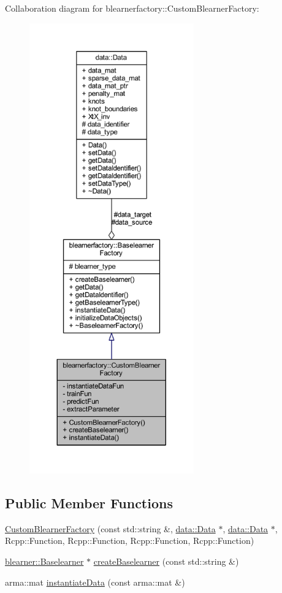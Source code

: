Collaboration diagram for blearnerfactory\+:\+:Custom\+Blearner\+Factory\+:\nopagebreak
\begin{figure}[H]
\begin{center}
\leavevmode
\includegraphics[height=550pt]{classblearnerfactory_1_1_custom_blearner_factory__coll__graph}
\end{center}
\end{figure}
\subsection*{Public Member Functions}
\begin{DoxyCompactItemize}
\item 
\hyperlink{classblearnerfactory_1_1_custom_blearner_factory_a1a006cb772dc79cbcbcab810f5431b2c}{Custom\+Blearner\+Factory} (const std\+::string \&, \hyperlink{classdata_1_1_data}{data\+::\+Data} $\ast$, \hyperlink{classdata_1_1_data}{data\+::\+Data} $\ast$, Rcpp\+::\+Function, Rcpp\+::\+Function, Rcpp\+::\+Function, Rcpp\+::\+Function)
\item 
\hyperlink{classblearner_1_1_baselearner}{blearner\+::\+Baselearner} $\ast$ \hyperlink{classblearnerfactory_1_1_custom_blearner_factory_aad915d1ac58a323d1584d27f8cdace56}{create\+Baselearner} (const std\+::string \&)
\item 
arma\+::mat \hyperlink{classblearnerfactory_1_1_custom_blearner_factory_aac818f8969820d37ec1a391abbb996da}{instantiate\+Data} (const arma\+::mat \&)
\end{DoxyCompactItemize}
